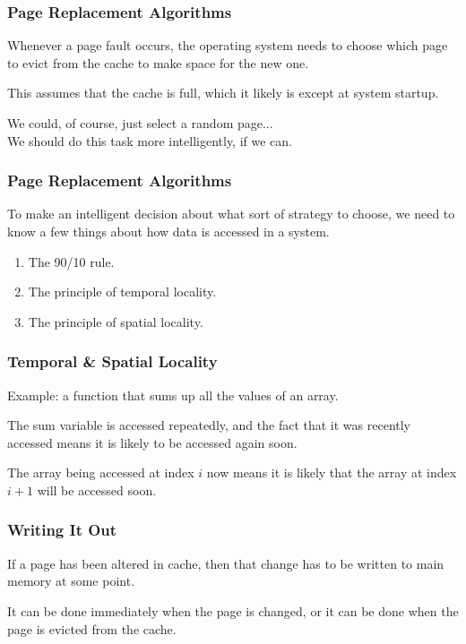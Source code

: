 \begin{frame}
\frametitle{Page Replacement Algorithms}

Whenever a page fault occurs, the operating system needs to choose which page to \alert{evict} from the cache to make space for the new one. 

This assumes that the cache is full, which it likely is except at system startup. 

We could, of course, just select a random page...\\
\quad We should do this task more intelligently, if we can.

\end{frame}


\begin{frame}
\frametitle{Page Replacement Algorithms}
To make an intelligent decision about what sort of strategy to choose, we need to know a few things about how data is accessed in a system.



\begin{enumerate}
	\item The 90/10 rule.
	\item The principle of \alert{temporal locality}. 
	\item The principle of \alert{spatial locality}.
\end{enumerate}

\end{frame}

\begin{frame}
\frametitle{Temporal \& Spatial Locality}

Example: a function that sums up all the values of an array. 

The sum variable is accessed repeatedly, and the fact that it was recently accessed means it is likely to be accessed again soon. 

The array being accessed at index $i$ now means it is likely that the array at index $i+1$ will be accessed soon.

\end{frame}

\begin{frame}
\frametitle{Writing It Out}

If a page has been altered in cache, then that change has to be written to main memory at some point. 

It can be done immediately when the page is changed, or it can be done when the page is evicted from the cache. 

\end{frame}

